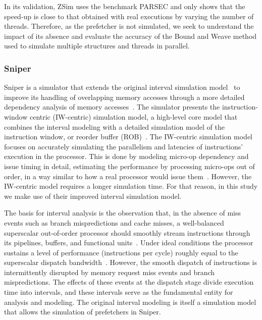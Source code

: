 \documentclass[AMA,final,STIX1COL]{WileyNJD-v2}
\begin{document}
In its validation, ZSim uses the benchmark PARSEC \cite{bienia2008parsec} and only shows that the speed-up is close to that obtained with real executions by varying the number of threads.
Therefore, as the prefetcher is not simulated, we seek to understand the impact of its absence and evaluate the accuracy of the Bound and Weave method used to simulate multiple structures and threads in parallel. 

\subsubsection{Sniper}
\label{subsubsec:sniper}

Sniper is a simulator that extends the original interval simulation model~\cite{genbrugge2010interval} to improve its handling of overlapping memory accesses through a more detailed dependency analysis of memory accesses~\cite{carlson2014aeohmcm}.
The simulator presents the instruction-window centric (IW-centric) simulation model, a high-level core model that combines the interval modeling with a detailed simulation model of the instruction window, or reorder buffer (ROB)~\cite{carlson2014aeohmcm}.
The IW-centric simulation model focuses on accurately simulating the parallelism and latencies of instructions' execution in the processor. 
This is done by modeling micro-op dependency and issue timing in detail, estimating the performance by processing micro-ops out of order, in a way similar to how a real processor would issue them~\cite{carlson2014aeohmcm}.
However, the IW-centric model requires a longer simulation time.
For that reason, in this study we make use of their improved interval simulation model.

The basis for interval analysis is the observation that, in the absence of miss events such as branch mispredictions and cache misses, a well-balanced superscalar out-of-order processor should smoothly stream instructions through its pipelines, buffers, and functional units~\cite{eyerman2009model}. 
Under ideal conditions the processor sustains a level of performance (instructions per cycle) roughly equal to the superscalar dispatch bandwidth~\cite{eyerman2009model}. 
However, the smooth dispatch of instructions is intermittently disrupted by memory request miss events and branch mispredictions.
The effects of these events at the dispatch stage divide execution time into intervals, and these intervals serve as the fundamental entity for analysis and modeling\cite{eyerman2009model}.
The original interval modeling is itself a simulation model that allows the simulation of prefetchers in Sniper.
\end{document}
